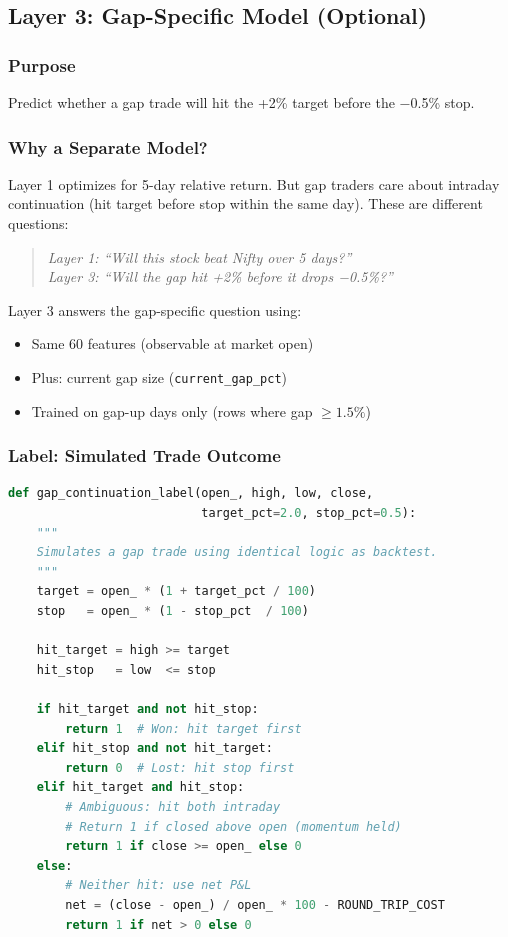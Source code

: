 \documentclass[11pt,a4paper]{article}
\begin{document}
\subsection{Layer 3: Gap-Specific Model (Optional)}

\subsubsection{Purpose}

Predict whether a gap trade will hit the +2\% target before the −0.5\% stop.

\subsubsection{Why a Separate Model?}

Layer 1 optimizes for 5-day relative return. But gap traders care about intraday continuation (hit target before stop within the same day). These are different questions:

\begin{quote}
\textit{Layer 1: ``Will this stock beat Nifty over 5 days?''}\\
\textit{Layer 3: ``Will the gap hit +2\% before it drops −0.5\%?''}
\end{quote}

Layer 3 answers the gap-specific question using:
\begin{itemize}
    \item Same 60 features (observable at market open)
    \item Plus: current gap size (\texttt{current\_gap\_pct})
    \item Trained on gap-up days only (rows where gap $\geq 1.5\%$)
\end{itemize}

\subsubsection{Label: Simulated Trade Outcome}

\begin{lstlisting}[language=Python, caption=Gap Continuation Labeling]
def gap_continuation_label(open_, high, low, close,
                           target_pct=2.0, stop_pct=0.5):
    """
    Simulates a gap trade using identical logic as backtest.
    """
    target = open_ * (1 + target_pct / 100)
    stop   = open_ * (1 - stop_pct  / 100)

    hit_target = high >= target
    hit_stop   = low  <= stop

    if hit_target and not hit_stop:
        return 1  # Won: hit target first
    elif hit_stop and not hit_target:
        return 0  # Lost: hit stop first
    elif hit_target and hit_stop:
        # Ambiguous: hit both intraday
        # Return 1 if closed above open (momentum held)
        return 1 if close >= open_ else 0
    else:
        # Neither hit: use net P&L
        net = (close - open_) / open_ * 100 - ROUND_TRIP_COST
        return 1 if net > 0 else 0
\end{lstlisting}
\end{document}
